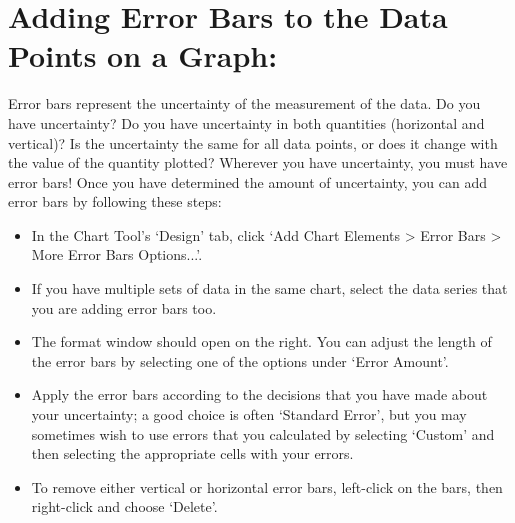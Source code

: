 \section*{Adding Error Bars to the Data Points on a Graph:}
Error bars represent the uncertainty of the measurement of the data. 
Do you have uncertainty? 
Do you have uncertainty in both quantities (horizontal and vertical)? 
Is the uncertainty the same for all data points, or does it change with the value of the quantity plotted? 
Wherever you have uncertainty, you must have error bars! 
Once you have determined the amount of uncertainty, you can add error bars by following these steps:
\begin{itemize}
\itemsep-0.3em
\item In the Chart Tool's `Design' tab, click `Add Chart Elements > Error Bars > More Error Bars Options...'. 
\item If you have multiple sets of data in the same chart, select the data series that you are adding error bars too.
\item The format window should open on the right. You can adjust the length of the error bars by selecting one of the options under `Error Amount'.
\item Apply the error bars according to the decisions that you have made about your uncertainty; a good choice is often `Standard Error', but you may sometimes wish to use errors that you calculated by selecting `Custom' and then selecting the appropriate cells with your errors. 
\item To remove either vertical or horizontal error bars, left-click on the bars, then right-click and choose `Delete'.
\end{itemize}

